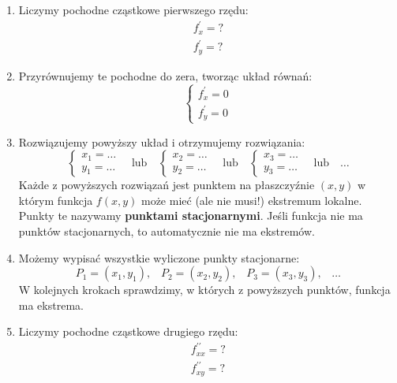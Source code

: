 \begin{enumerate}
    \item Liczymy pochodne cząstkowe pierwszego rzędu:
    \[
        \begin{matrix}
            f^{\prime}_x=? \\
            f^{\prime}_y=?
        \end{matrix}
    \]
    \item Przyrównujemy te pochodne do zera, tworząc układ równań:
    \[
        \left\{\begin{matrix}
                   f^{\prime}_x=0 \\
                   f^{\prime}_y=0
        \end{matrix}\right.
    \]
    \item Rozwiązujemy powyższy układ i otrzymujemy rozwiązania:
    \[
        \left\{\begin{matrix}
                   x_1= \dots \\ y_1= \dots
        \end{matrix}\right.
        \quad
        \text{lub}
        \quad
        \left\{\begin{matrix}
                   x_2= \dots \\ y_2= \dots
        \end{matrix}\right.
        \quad
        \text{lub}
        \quad
        \left\{\begin{matrix}
                   x_3= \dots \\ y_3= \dots
        \end{matrix}\right.
        \quad
        \text{lub}
        \quad
        \ldots
    \]
    Każde z powyższych rozwiązań jest punktem na płaszczyźnie $(x,y)$ w którym funkcja $f(x,y)$
    może mieć (ale nie musi!) ekstremum lokalne.
    Punkty te nazywamy \textbf{punktami stacjonarnymi}.
    Jeśli funkcja nie ma punktów stacjonarnych, to automatycznie nie ma ekstremów.
    \item Możemy wypisać wszystkie wyliczone punkty stacjonarne:
    \[
        P_1=(x_1,y_1)\text{,}\quad P_2=(x_2,y_2)\text{,}\quad P_3=(x_3,y_3)\text{,}\quad \dots
    \]
    W kolejnych krokach sprawdzimy, w których z powyższych punktów, funkcja ma ekstrema.
    \item Liczymy pochodne cząstkowe drugiego rzędu:
    \[
        \begin{matrix}
            f^{\prime\prime}_{xx}=? \\
            f^{\prime\prime}_{xy}=? \\

\end{matrix}\]
\end{enumerate}
